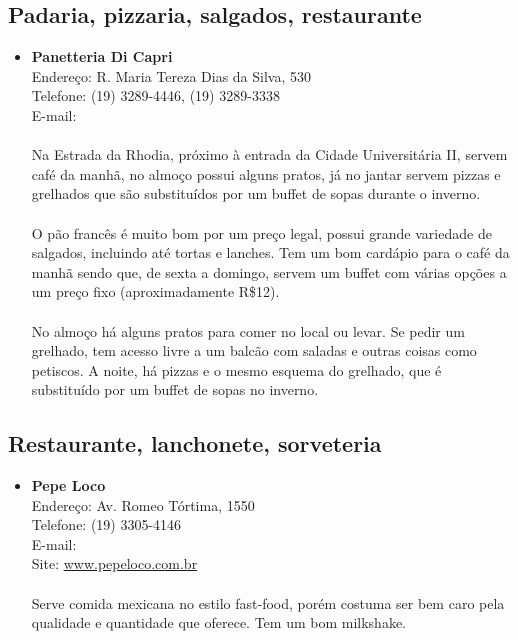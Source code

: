\subsection{Padaria, pizzaria, salgados, restaurante}

\begin{itemize}
\item \textbf{Panetteria Di Capri}
  \\Endereço: R. Maria Tereza Dias da Silva, 530
  \\Telefone: (19) 3289-4446, (19) 3289-3338
  \\E-mail: 
  \\
  \\Na Estrada da Rhodia, próximo à entrada da Cidade Universitária II, servem
  café da manhã, no almoço possui alguns pratos, já no jantar servem pizzas e
  grelhados que são substituídos por um buffet de sopas durante o inverno.
  \\
  \\O pão francês é muito bom por um preço legal, possui grande variedade de
  salgados, incluindo até tortas e lanches. Tem um bom cardápio para o café da
  manhã sendo que, de sexta a domingo, servem um buffet com várias opções a um
  preço fixo (aproximadamente R\$12).
  \\
  \\No almoço há alguns pratos para comer no local ou levar. Se pedir um
  grelhado, tem acesso livre a um balcão com saladas e outras coisas como
  petiscos. A noite, há pizzas e o mesmo esquema do grelhado, que é substituído
  por um buffet de sopas no inverno.
\end{itemize}

\subsection{Restaurante, lanchonete, sorveteria}

\begin{itemize}
\item \textbf{Pepe Loco}
  \\Endereço: Av. Romeo Tórtima, 1550
  \\Telefone: (19) 3305-4146
  \\E-mail: 
  \\Site: \url{www.pepeloco.com.br}
  \\
  \\Serve comida mexicana no estilo fast-food, porém costuma ser bem caro pela
  qualidade e quantidade que oferece. Tem um bom milkshake.
\end{itemize}

